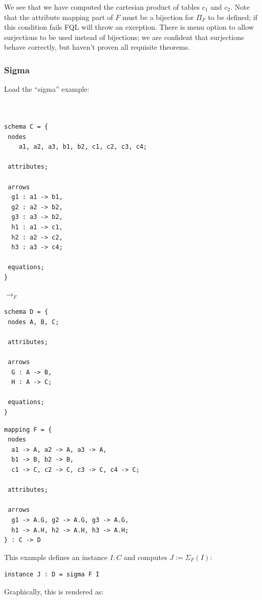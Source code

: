 \documentclass[12pt]{article}
\begin{document}
We see that we have computed the cartesian product of tables $c_1$ and $c_2$.  Note that the attribute mapping part of $F$ must be a bijection for $\Pi_F$ to be defined; if this condition fails FQL will throw an exception.  There is menu option to allow surjections to be used instead of bijections; we are confident that surjections behave correctly, but haven't proven all requisite theorems.

\subsubsection{Sigma}


Load the ``sigma'' example:

 \begin{minipage}{0.4\textwidth}
\begin{verbatim} 


schema C = {
 nodes
 	a1, a2, a3, b1, b2, c1, c2, c3, c4;
 	
 attributes;
 
 arrows
  g1 : a1 -> b1, 
  g2 : a2 -> b2, 
  g3 : a3 -> b2,
  h1 : a1 -> c1, 
  h2 : a2 -> c2, 
  h3 : a3 -> c4;
 	
 equations;
}    \end{verbatim}
  \end{minipage}
   \hspace{.5in} $\to_F$ \hspace{.5in}
  \begin{minipage}{0.4\textwidth}
\begin{verbatim} 
schema D = {
 nodes A, B, C;
 	
 attributes;
 
 arrows
  G : A -> B, 
  H : A -> C;
	
 equations;
}
\end{verbatim} \end{minipage}
\begin{verbatim}
mapping F = {
 nodes 
  a1 -> A, a2 -> A, a3 -> A,
  b1 -> B, b2 -> B, 
  c1 -> C, c2 -> C, c3 -> C, c4 -> C;
  	
 attributes;
 
 arrows 
  g1 -> A.G, g2 -> A.G, g3 -> A.G,
  h1 -> A.H, h2 -> A.H, h3 -> A.H;
} : C -> D
\end{verbatim}
This example defines an instance $I : C$ and computes $J := \Sigma_F(I)$:
\begin{verbatim}
instance J : D = sigma F I
\end{verbatim}
Graphically, this is rendered as:
\end{document}
